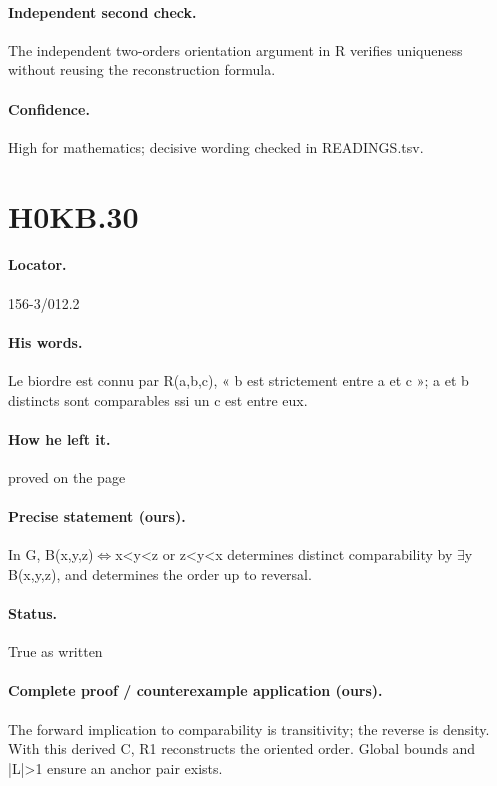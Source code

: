 \paragraph{Independent second check.} The independent two-orders orientation argument in R verifies uniqueness without reusing the reconstruction formula.

\paragraph{Confidence.} High for mathematics; decisive wording checked in READINGS.tsv.

\section*{H0KB.30}\label{statement:H0KB.30}
\paragraph{Locator.} 156-3/012.2

\paragraph{His words.} Le biordre est connu par R(a,b,c), « b est strictement entre a et c »; a et b distincts sont comparables ssi un c est entre eux.

\paragraph{How he left it.} proved on the page

\paragraph{Precise statement (ours).} In G, B(x,y,z)\ensuremath{\Longleftrightarrow}x<y<z or z<y<x determines distinct comparability by \ensuremath{\exists}y B(x,y,z), and determines the order up to reversal.

\paragraph{Status.} True as written

\paragraph{Complete proof / counterexample application (ours).} The forward implication to comparability is transitivity; the reverse is density. With this derived C, R1 reconstructs the oriented order. Global bounds and |L|>1 ensure an anchor pair exists.

